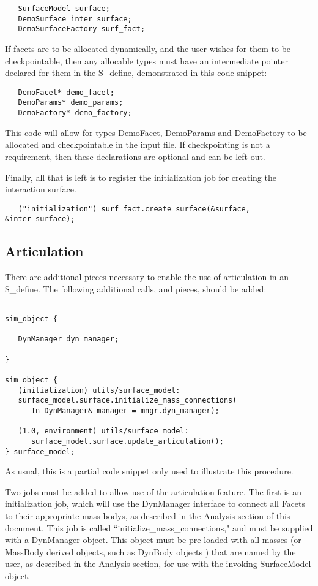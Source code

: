 \begin{verbatim}
   SurfaceModel surface;
   DemoSurface inter_surface;
   DemoSurfaceFactory surf_fact;
\end{verbatim}

If facets are to be allocated dynamically, and the user wishes for them to be checkpointable, then
any allocable types must have an intermediate pointer declared for them in the S\_define, demonstrated
in this code snippet:

\begin{verbatim}
   DemoFacet* demo_facet;
   DemoParams* demo_params;
   DemoFactory* demo_factory;
\end{verbatim}

This code will allow for types DemoFacet, DemoParams and DemoFactory to be allocated and checkpointable
in the input file. If checkpointing is not a requirement, then these declarations are optional and can
be left out.

Finally, all that is left is to register the initialization job for creating the interaction surface.

\begin{verbatim}
   ("initialization") surf_fact.create_surface(&surface, &inter_surface);
\end{verbatim}

\subsection{Articulation}

There are additional pieces necessary to enable the use of articulation
in an S\_define. The following additional calls, and pieces, should be added:

\begin{verbatim}

sim_object {

   DynManager dyn_manager;

}

sim_object {
   (initialization) utils/surface_model:
   surface_model.surface.initialize_mass_connections(
      In DynManager& manager = mngr.dyn_manager);

   (1.0, environment) utils/surface_model:
      surface_model.surface.update_articulation();
} surface_model;
\end{verbatim}

As usual, this is a partial code snippet only used to illustrate this procedure.

Two jobs must be added to allow use of the articulation feature. The first is an
initialization job, which will use the DynManager interface to connect all
Facets to their appropriate mass bodys, as described in the Analysis section of this document.
This job is called ``initialize\_mass\_connections," and must be supplied with a DynManager
object. This object must be pre-loaded with all masses (or MassBody derived objects, such as
DynBody objects \cite{dynenv:DYNBODY}) that are named by the user, as described in the Analysis section,
for use with the invoking SurfaceModel object.

